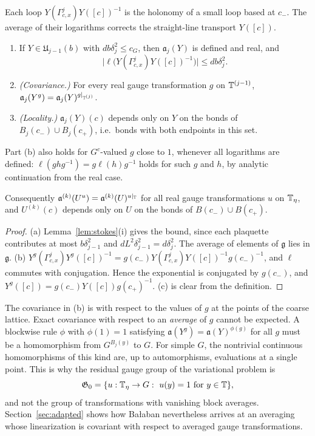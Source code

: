 Each loop $Y(\Gamma^j_{c,x})Y([c])^{-1}$ is the holonomy of a small loop based at $c_-$. The average of their logarithms corrects the straight-line transport $Y([c])$.

\begin{lemma}\label{lem:one-step-basic}
\begin{enumerate}[label=(\alph*)]
\item If $Y\in\mathfrak U_{j-1}(b)$ with $db\delta_j^2\le c_G$, then $\mathfrak a_j(Y)$ is defined and real, and
\[
\big|\ell\big(Y(\Gamma^j_{c,x})Y([c])^{-1}\big)\big|\le db\delta_j^2 .
\]
\item \emph{(Covariance.)} For every real gauge transformation $g$ on $\mathbb T^{(j-1)}$, $\mathfrak a_j(Y^g)=\mathfrak a_j(Y)^{g|_{\mathbb T^{(j)}}}$.
\item \emph{(Locality.)} $\mathfrak a_j(Y)(c)$ depends only on $Y$ on the bonds of $B_j(c_-)\cup B_j(c_+)$, i.e.\ bonds with both endpoints in this set.
\end{enumerate}
Part (b) also holds for $G^c$-valued $g$ close to $1$, whenever all logarithms are defined: $\ell(ghg^{-1})=g\ell(h)g^{-1}$ holds for such $g$ and $h$, by analytic continuation from the real case.

Consequently $\mathfrak a^{(k)}(U^u)=\mathfrak a^{(k)}(U)^{u|_\mathbb T}$ for all real gauge transformations $u$ on $\mathbb T_\eta$, and $U^{(k)}(c)$ depends only on $U$ on the bonds of $B(c_-)\cup B(c_+)$.
\end{lemma}

\begin{proof}
(a) Lemma~\ref{lem:stokes}(i) gives the bound, since each plaquette contributes at most $b\delta_{j-1}^2$ and $dL^2\delta_{j-1}^2=d\delta_j^2$. The average of elements of $\mathfrak g$ lies in $\mathfrak g$. (b) $Y^g(\Gamma^j_{c,x})Y^g([c])^{-1}=g(c_-)Y(\Gamma^j_{c,x})Y([c])^{-1}g(c_-)^{-1}$, and $\ell$ commutes with conjugation. Hence the exponential is conjugated by $g(c_-)$, and $Y^g([c])=g(c_-)Y([c])g(c_+)^{-1}$. (c) is clear from the definition.
\end{proof}

The covariance in (b) is with respect to the values of $g$ at the points of the coarse lattice. Exact covariance with respect to an \emph{average} of $g$ cannot be expected. A blockwise rule $\phi$ with $\phi(1)=1$ satisfying $\mathfrak a(Y^g)=\mathfrak a(Y)^{\phi(g)}$ for all $g$ must be a homomorphism from $G^{B_j(y)}$ to $G$. For simple $G$, the nontrivial continuous homomorphisms of this kind are, up to automorphisms, evaluations at a single point. This is why the residual gauge group of the variational problem is
\[
\mathfrak G_0=\{u:\mathbb T_\eta\to G:\ u(y)=1\text{ for }y\in\mathbb T\},
\]
and not the group of transformations with vanishing block averages. Section~\ref{sec:adapted} shows how Ba\l aban nevertheless arrives at an averaging whose linearization is covariant with respect to averaged gauge transformations.


